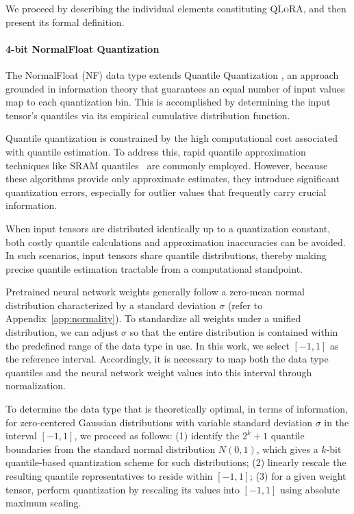 We proceed by describing the individual elements constituting \textsc{QLoRA}, and then present its formal definition.

\paragraph{4-bit NormalFloat Quantization} The NormalFloat (NF) data type extends Quantile Quantization \citep{dettmers2022optimizers}, an approach grounded in information theory that guarantees an equal number of input values map to each quantization bin. This is accomplished by determining the input tensor's quantiles via its empirical cumulative distribution function.

Quantile quantization is constrained by the high computational cost associated with quantile estimation. To address this, rapid quantile approximation techniques like SRAM quantiles~\citep{dettmers2022optimizers} are commonly employed. However, because these algorithms provide only approximate estimates, they introduce significant quantization errors, especially for outlier values that frequently carry crucial information.

When input tensors are distributed identically up to a quantization constant, both costly quantile calculations and approximation inaccuracies can be avoided. In such scenarios, input tensors share quantile distributions, thereby making precise quantile estimation tractable from a computational standpoint.

Pretrained neural network weights generally follow a zero-mean normal distribution characterized by a standard deviation $\sigma$ (refer to Appendix~\ref{app:normality}). To standardize all weights under a unified distribution, we can adjust $\sigma$ so that the entire distribution is contained within the predefined range of the data type in use. In this work, we select $[-1, 1]$ as the reference interval. Accordingly, it is necessary to map both the data type quantiles and the neural network weight values into this interval through normalization.

To determine the data type that is theoretically optimal, in terms of information, for zero-centered Gaussian distributions with variable standard deviation $\sigma$ in the interval $[-1, 1]$, we proceed as follows: (1) identify the $2^k+1$ quantile boundaries from the standard normal distribution $N(0, 1)$, which gives a $k$-bit quantile-based quantization scheme for such distributions; (2) linearly rescale the resulting quantile representatives to reside within $[-1, 1]$; (3) for a given weight tensor, perform quantization by rescaling its values into $[-1, 1]$ using absolute maximum scaling.

